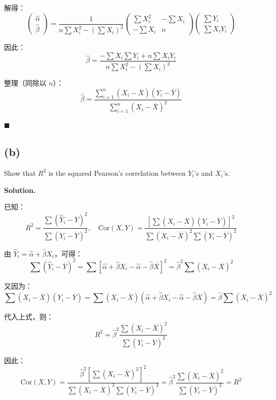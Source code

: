 解得：
\[
\begin{pmatrix} \widehat{\alpha} \\ \widehat{\beta} \end{pmatrix} = \frac{1}{n\sum X_i^2 - (\sum X_i)^2} \begin{pmatrix} \sum X_i^2 & -\sum X_i \\ -\sum X_i & n \end{pmatrix} \begin{pmatrix} \sum Y_i \\ \sum X_i Y_i \end{pmatrix}
\]

因此：
\[
\widehat{\beta} = \frac{-\sum X_i \sum Y_i + n\sum X_i Y_i}{n\sum X_i^2 - (\sum X_i)^2}
\]

整理（同除以 $n$）：
\[
\widehat{\beta} = \frac{\sum_{i=1}^{n}(X_i - \overline{X})(Y_i - \overline{Y})}{\sum_{i=1}^{n}(X_i - \overline{X})^2}
\]

\hfill $\blacksquare$

\subsection*{(b)}

Show that $R^2$ is the squared Pearson's correlation between $Y_i$'s and $X_i$'s.

\textbf{Solution.}

已知：
\[
R^2 = \frac{\sum(\widehat{Y}_i - \overline{Y})^2}{\sum(Y_i - \overline{Y})^2}, \quad \text{Cor}(X,Y) = \frac{[\sum(X_i - \overline{X})(Y_i - \overline{Y})]^2}{\sum(X_i - \overline{X})^2 \sum(Y_i - \overline{Y})^2}
\]

由 $\widehat{Y}_i = \widehat{\alpha} + \widehat{\beta} X_i$，可得：
\[
\sum(\widehat{Y}_i - \overline{Y})^2 = \sum[\widehat{\alpha} + \widehat{\beta} X_i - \widehat{\alpha} - \widehat{\beta}\overline{X}]^2 = \widehat{\beta}^2 \sum(X_i - \overline{X})^2
\]

又因为：
\[
\sum(X_i - \overline{X})(Y_i - \overline{Y}) = \sum(X_i - \overline{X})(\widehat{\alpha} + \widehat{\beta} X_i - \widehat{\alpha} - \widehat{\beta}\overline{X}) = \widehat{\beta}\sum(X_i - \overline{X})^2
\]

代入上式，则：
\[
R^2 = \widehat{\beta}^2 \frac{\sum(X_i - \overline{X})^2}{\sum(Y_i - \overline{Y})^2}
\]

因此：
\[
\text{Cor}(X,Y) = \frac{\widehat{\beta}^2 [\sum(X_i - \overline{X})^2]^2}{\sum(X_i - \overline{X})^2 \sum(Y_i - \overline{Y})^2} = \widehat{\beta}^2 \frac{\sum(X_i - \overline{X})^2}{\sum(Y_i - \overline{Y})^2} = R^2
\]

